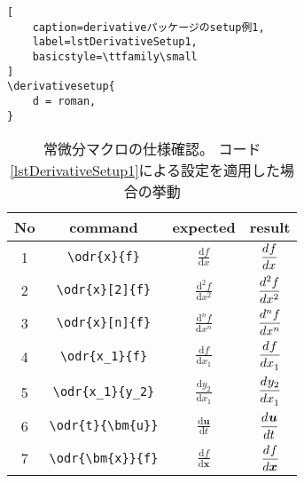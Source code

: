 \documentclass{jsarticle}
\renewcommand{\d}{\textrm{d}}
\begin{document}
\begin{table}[p]
\begin{lstlisting}[
	caption=derivativeパッケージのsetup例1,
	label=lstDerivativeSetup1,
	basicstyle=\ttfamily\small
]
\derivativesetup{
	d = roman,
}
\end{lstlisting}
\end{table}
%
\begin{table}[p]
\centering
\caption{
	常微分マクロの仕様確認。
	コード\ref{lstDerivativeSetup1}による設定を適用した場合の挙動
}
\begin{tabular}{cccc}
No & command & expected & result \\
\hline
1&	\verb|\odr{x}{f}|				& $\displaystyle \frac{\d f}{\d x}$
									& $\displaystyle \odr{x}{f}$ \\[3mm]
2&	\verb|\odr{x}[2]{f}|			& $\displaystyle \frac{\d^2 f}{\d x^2}$
									& $\displaystyle \odr{x}[2]{f}$ \\[3mm]
3&	\verb|\odr{x}[n]{f}|			& $\displaystyle \frac{\d^n f}{\d x^n}$
									& $\displaystyle \odr{x}[n]{f}$ \\[3mm]
4&	\verb|\odr{x_1}{f}|				& $\displaystyle \frac{\d f}{\d x_1}$
									& $\displaystyle \odr{x_1}{f}$ \\[3mm]
5&	\verb|\odr{x_1}{y_2}|			& $\displaystyle \frac{\d y_2}{\d x_1}$
									& $\displaystyle \odr{x_1}{y_2}$ \\[3mm]
6&	\verb|\odr{t}{\bm{u}}|			& $\displaystyle \frac{\d\bm{u}}{\d t}$
									& $\displaystyle \odr{t}{\bm{u}}$ \\[3mm]
7&	\verb|\odr{\bm{x}}{f}|			& $\displaystyle \frac{\d f}{\d\bm{x}}$
									& $\displaystyle \odr{\bm{x}}{f}$ \\[3mm]
\end{tabular}
\end{table}
\end{document}
